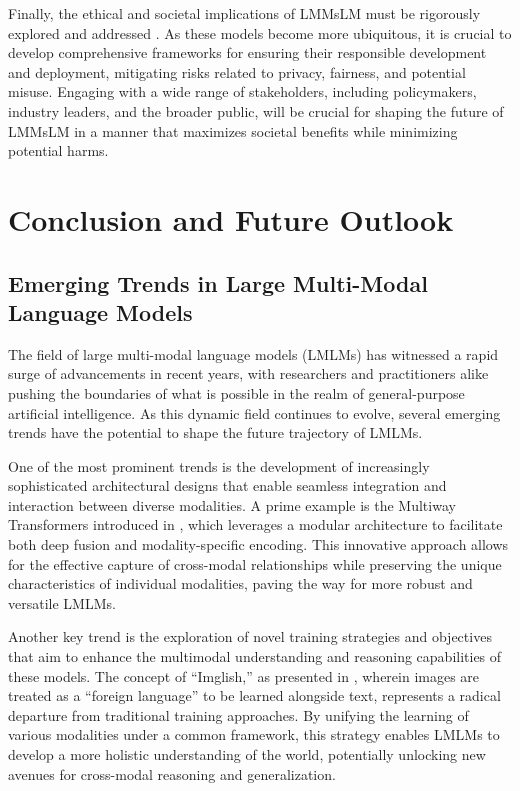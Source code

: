 \documentclass[11pt]{article}
\begin{document}
Finally, the ethical and societal implications of LMMsLM must be rigorously explored and addressed \cite{ref91,ref348}. As these models become more ubiquitous, it is crucial to develop comprehensive frameworks for ensuring their responsible development and deployment, mitigating risks related to privacy, fairness, and potential misuse. Engaging with a wide range of stakeholders, including policymakers, industry leaders, and the broader public, will be crucial for shaping the future of LMMsLM in a manner that maximizes societal benefits while minimizing potential harms.

\section{Conclusion and Future Outlook}

\subsection{Emerging Trends in Large Multi-Modal Language Models}

The field of large multi-modal language models (LMLMs) has witnessed a rapid surge of advancements in recent years, with researchers and practitioners alike pushing the boundaries of what is possible in the realm of general-purpose artificial intelligence. As this dynamic field continues to evolve, several emerging trends have the potential to shape the future trajectory of LMLMs.

One of the most prominent trends is the development of increasingly sophisticated architectural designs that enable seamless integration and interaction between diverse modalities. A prime example is the Multiway Transformers introduced in \cite{ref139}, which leverages a modular architecture to facilitate both deep fusion and modality-specific encoding. This innovative approach allows for the effective capture of cross-modal relationships while preserving the unique characteristics of individual modalities, paving the way for more robust and versatile LMLMs.

Another key trend is the exploration of novel training strategies and objectives that aim to enhance the multimodal understanding and reasoning capabilities of these models. The concept of ``Imglish,'' as presented in \cite{ref139}, wherein images are treated as a ``foreign language'' to be learned alongside text, represents a radical departure from traditional training approaches. By unifying the learning of various modalities under a common framework, this strategy enables LMLMs to develop a more holistic understanding of the world, potentially unlocking new avenues for cross-modal reasoning and generalization.
\end{document}
